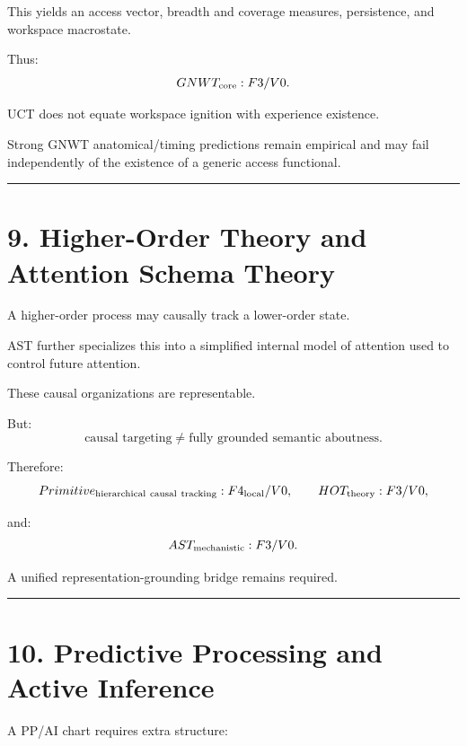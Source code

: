 \documentclass[
  11pt,
  a4paper,
]{article}
\begin{document}
This yields an access vector, breadth and coverage measures,
persistence, and workspace macrostate.

Thus:
\nopagebreak[4]
\[
GNWT_{\rm core}:F3/V0.
\]

UCT does not equate workspace ignition with experience existence.

Strong GNWT anatomical/timing predictions remain empirical and may fail
independently of the existence of a generic access functional.

\begin{center}\rule{0.5\linewidth}{0.5pt}\end{center}

\hypertarget{higher-order-theory-and-attention-schema-theory}{%
\section{9. Higher-Order Theory and Attention Schema
Theory}\label{higher-order-theory-and-attention-schema-theory}}

A higher-order process may causally track a lower-order state.

AST further specializes this into a simplified internal model of
attention used to control future attention.

These causal organizations are representable.

But:
\nopagebreak[4]
\[
\boxed{
\text{causal targeting}
\neq
\text{fully grounded semantic aboutness}.
}
\]

Therefore:
\nopagebreak[4]
\[
Primitive_{\rm hierarchical\ causal\ tracking}:F4_{\rm local}/V0,
\qquad
HOT_{\rm theory}:F3/V0,
\]

and:
\nopagebreak[4]
\[
AST_{\rm mechanistic}:F3/V0.
\]

A unified representation-grounding bridge remains required.

\begin{center}\rule{0.5\linewidth}{0.5pt}\end{center}

\hypertarget{predictive-processing-and-active-inference}{%
\section{10. Predictive Processing and Active
Inference}\label{predictive-processing-and-active-inference}}

A PP/AI chart requires extra structure:
\end{document}
